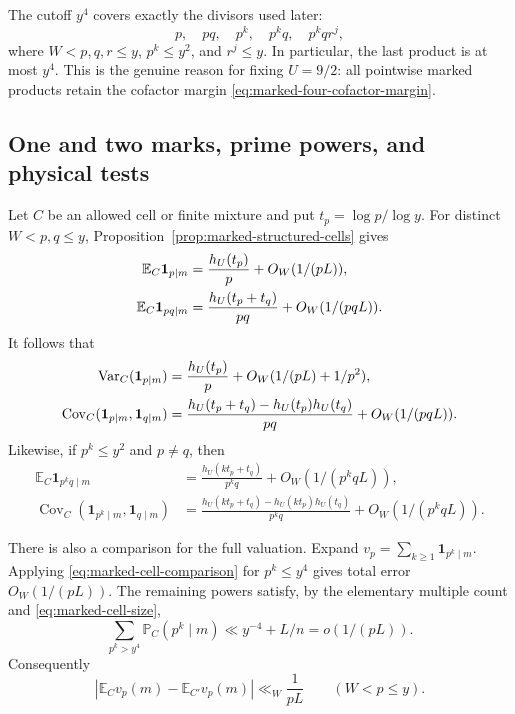 \documentclass[11pt]{article}
\numberwithin{equation}{section}
\theoremstyle{definition}
\theoremstyle{remark}
\newcommand{\1}{\mathbf 1}
\begin{document}
The cutoff \(y^4\) covers exactly the divisors used later:
\begin{equation}
 p,\quad pq,\quad p^k,\quad p^kq,\quad p^kqr^j,
 \label{eq:marked-covered-divisors}
\end{equation}
where \(W<p,q,r\le y\), \(p^k\le y^2\), and \(r^j\le y\).
In particular, the last product is at most \(y^4\).  This is the genuine
reason for fixing \(U=9/2\): all pointwise marked products retain the
cofactor margin \eqref{eq:marked-four-cofactor-margin}.

\subsection{One and two marks, prime powers, and physical tests}
\label{subsec:marked-consequences}

Let \(C\) be an allowed cell or finite mixture and put
\(t_p=\log p/\log y\).  For distinct \(W<p,q\le y\),
Proposition~\ref{prop:marked-structured-cells} gives
\begin{align}
 \mathbb E_C\1_{p\mid m}
 &=\frac{h_U(t_p)}p+O_W(1/(pL)),\notag\\
 \mathbb E_C\1_{pq\mid m}
 &=\frac{h_U(t_p+t_q)}{pq}+O_W(1/(pqL)).
 \label{eq:marked-one-two}
\end{align}
It follows that
\begin{align}
 \operatorname{Var}_C(\1_{p\mid m})
 &=\frac{h_U(t_p)}p+O_W(1/(pL)+1/p^2),\notag\\
 \operatorname{Cov}_C(\1_{p\mid m},\1_{q\mid m})
 &=\frac{h_U(t_p+t_q)-h_U(t_p)h_U(t_q)}{pq}
       +O_W(1/(pqL)).
 \label{eq:marked-one-two-covariance}
\end{align}
Likewise, if \(p^k\le y^2\) and \(p\ne q\), then
\begin{align}
 \mathbb E_C\1_{p^kq\mid m}
 &=\frac{h_U(kt_p+t_q)}{p^kq}+O_W(1/(p^kqL)),
 \label{eq:marked-power-two}\\
 \operatorname{Cov}_C(\1_{p^k\mid m},\1_{q\mid m})
 &=\frac{h_U(kt_p+t_q)-h_U(kt_p)h_U(t_q)}{p^kq}
       +O_W(1/(p^kqL)).
 \label{eq:marked-power-covariance}
\end{align}

There is also a comparison for the full valuation.  Expand
\(v_p=\sum_{k\ge1}\1_{p^k\mid m}\).  Applying
\eqref{eq:marked-cell-comparison} for \(p^k\le y^4\) gives total error
\(O_W(1/(pL))\).  The remaining powers satisfy, by the elementary
multiple count and \eqref{eq:marked-cell-size},
\[
 \sum_{p^k>y^4}\mathbb P_C(p^k\mid m)
 \ll y^{-4}+L/n=o(1/(pL)).
\]
Consequently
\begin{equation}
 |\mathbb E_Cv_p(m)-\mathbb E_{C'}v_p(m)|
 \ll_W\frac1{pL}\qquad(W<p\le y).
 \label{eq:marked-full-valuation-cell-comparison}
\end{equation}
\end{document}
